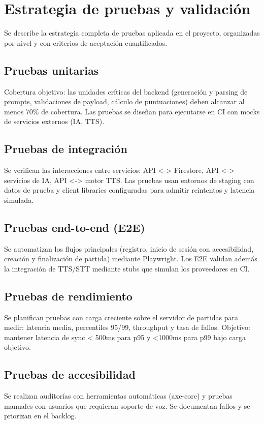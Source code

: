\documentclass[12pt]{article}
\begin{document}
\section{Estrategia de pruebas y validación}
Se describe la estrategia completa de pruebas aplicada en el proyecto, organizadas por nivel y con criterios de aceptación cuantificados.

\subsection{Pruebas unitarias}
Cobertura objetivo: las unidades críticas del backend (generación y parsing de prompts, validaciones de payload, cálculo de puntuaciones) deben alcanzar al menos 70\% de cobertura. Las pruebas se diseñan para ejecutarse en CI con mocks de servicios externos (IA, TTS).

\subsection{Pruebas de integración}
Se verifican las interacciones entre servicios: API <-> Firestore, API <-> servicios de IA, API <-> motor TTS. Las pruebas usan entornos de staging con datos de prueba y client libraries configuradas para admitir reintentos y latencia simulada.

\subsection{Pruebas end-to-end (E2E)}
Se automatizan los flujos principales (registro, inicio de sesión con accesibilidad, creación y finalización de partida) mediante Playwright. Los E2E validan además la integración de TTS/STT mediante stubs que simulan los proveedores en CI.

\subsection{Pruebas de rendimiento}
Se planifican pruebas con carga creciente sobre el servidor de partidas para medir: latencia media, percentiles 95/99, throughput y tasa de fallos. Objetivo: mantener latencia de sync < 500ms para p95 y <1000ms para p99 bajo carga objetivo.

\subsection{Pruebas de accesibilidad}
Se realizan auditorías con herramientas automáticas (axe-core) y pruebas manuales con usuarios que requieran soporte de voz. Se documentan fallos y se priorizan en el backlog.
\end{document}
